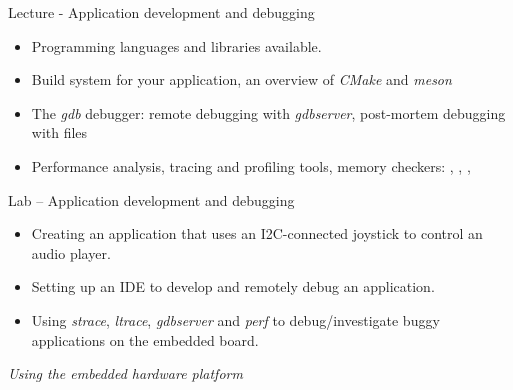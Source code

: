 \documentclass[a4paper,12pt,obeyspaces,spaces,hyphens]{article}
\begin{document}
\feagendatwocolumn
{Lecture - Application development and debugging}
{
  \begin{itemize}
  \item Programming languages and libraries available.
  \item Build system for your application, an overview of {\em CMake}
    and {\em meson}
  \item The {\em gdb} debugger: remote debugging with {\em gdbserver},
    post-mortem debugging with  files
  \item Performance analysis, tracing and profiling tools, memory
    checkers: , , ,
  \end{itemize}
}
{Lab – Application development and debugging}
{
  \begin{itemize}
  \item Creating an application that uses an I2C-connected joystick to
    control an audio player.
  \item Setting up an IDE to develop and remotely debug an
    application.
  \item Using {\em strace}, {\em ltrace}, {\em gdbserver} and {\em
      perf} to debug/investigate buggy applications on the embedded
    board.
  \end{itemize}

  \vspace{0.5cm}
  {\em Using the embedded hardware platform}
}
\end{document}

